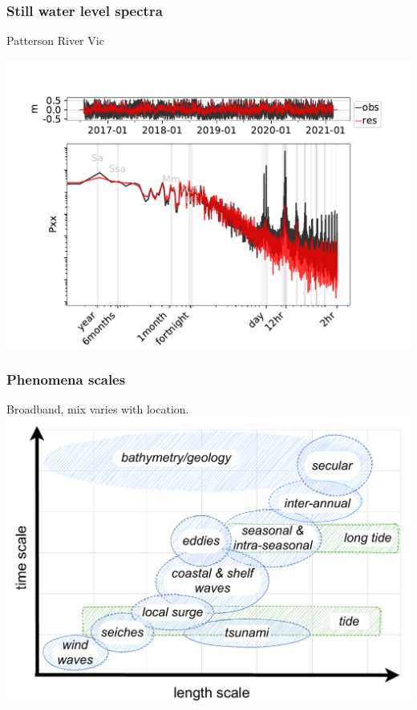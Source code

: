 \begin{frame}
\frametitle{Still water level spectra}
Patterson River Vic
\begin{minipage}{1.0\textwidth}
    \includegraphics[height=0.8\textheight]{figures/plots/586204_verify_Pxx.pdf}
\end{minipage}
\end{frame}
\begin{frame}
\frametitle{Phenomena scales}
Broadband, mix varies with location.     
    \includegraphics[height=0.8\textheight]{figures/diagrams/scales_time_length.pdf}
\end{frame}
